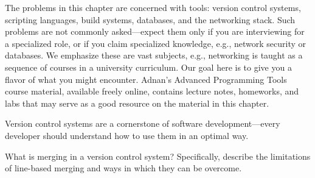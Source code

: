 \documentclass[10pt,openany,twoside,letterpaper,extrafontsizes]{memoir}
\begin{document}
\begin{Spacing}{\commonToolsSpacing}

The problems in this chapter are concerned with tools:
version control systems, scripting languages, build systems,
databases, and the networking stack.
Such problems are not commonly asked---expect them only if you are interviewing for a specialized
role, or
if you claim specialized knowledge, e.g., network security or databases.
We emphasize these are vast subjects, e.g., networking is taught
as a sequence of courses in a university curriculum. Our goal here
is to give you a flavor of what you might encounter.
Adnan's Advanced Programming Tools course material, available freely
online, contains lecture notes, homeworks, and labs  that may serve
as a good resource on the material in this chapter.


Version control systems are a cornerstone of software development---every developer should understand how to use them in an optimal way.

\label{semantic-syntax}


%
What is merging in a version control system?
Specifically, describe the limitations of line-based merging
and ways in which they can be overcome.



\end{Spacing}
\end{document}
